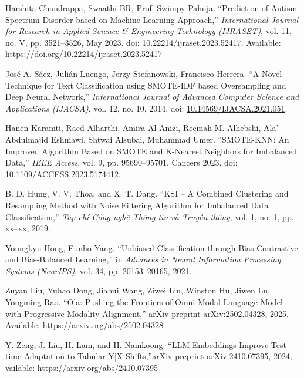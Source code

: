 \documentclass[conference]{IEEEtran}
\begin{document}
\begin{thebibliography}{99}
 Harshita Chandrappa, Swaathi BR, Prof. Swimpy Pahuja. ``Prediction of Autism Spectrum Disorder based on Machine Learning Approach,'' \textit{International Journal for Research in Applied Science \& Engineering Technology (IJRASET)}, vol. 11, no. V, pp. 3521–3526, May 2023. doi: 10.22214/ijraset.2023.52417.
Available: \url{https://doi.org/10.22214/ijraset.2023.52417}

 José A. Sáez, Julián Luengo, Jerzy Stefanowski, Francisco Herrera. ``A Novel Technique for Text Classification using SMOTE-IDF based Oversampling and Deep Neural Network,'' \textit{International Journal of Advanced Computer Science and Applications (IJACSA)}, vol. 12, no. 10, 2014. doi: \href{http://dx.doi.org/10.1016/j.ins.2014.08.051}{10.14569/IJACSA.2021.051}.  


 Hanen Karamti, Raed Alharthi, Amira Al Anizi, Reemah M. Alhebshi, Ala’ Abdulmajid Eshmawi, Shtwai Alsubai, Muhammad Umer. ``SMOTE-KNN: An Improved Algorithm Based on SMOTE and K-Nearest Neighbors for Imbalanced Data,'' \textit{IEEE Access}, vol. 9, pp. 95690–95701, Cancers 2023. doi: \href{https://doi.org/10.3390/cancers15174412}{10.1109/ACCESS.2023.5174412}.

 B. D. Hung, V. V. Thoa, and X. T. Dang. ``KSI – A Combined Clustering and Resampling Method with Noise Filtering Algorithm for Imbalanced Data Classification,'' \textit{Tạp chí Công nghệ Thông tin và Truyền thông}, vol. 1, no. 1, pp. xx–xx, 2019.

 Youngkyu Hong, Eunho Yang. ``Unbiased Classification through Bias-Contrastive and Bias-Balanced Learning,'' in \textit{Advances in Neural Information Processing Systems (NeurIPS)}, vol. 34, pp. 20153–20165, 2021.

 Zuyan Liu, Yuhao Dong, Jiahui Wang, Ziwei Liu, Winston Hu, Jiwen Lu, Yongming Rao. ``Ola: Pushing the Frontiers of Omni-Modal Language Model with Progressive Modality Alignment,'' arXiv preprint arXiv:2502.04328, 2025. Available: \url{https://arxiv.org/abs/2502.04328}

 Y. Zeng, J. Liu, H. Lam, and H. Namkoong. ``LLM Embeddings Improve Test-time Adaptation to Tabular Y|X-Shifts,''arXiv preprint arXiv:2410.07395, 2024, vailable: \url{https://arxiv.org/abs/2410.07395}


\end{thebibliography}
\end{document}
